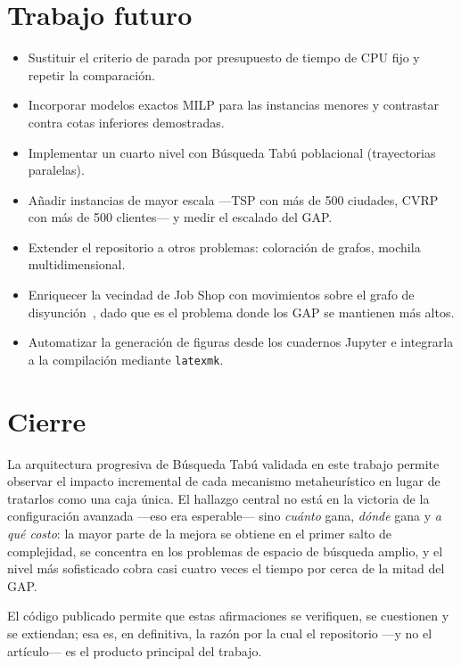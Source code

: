 \section{Trabajo futuro}

\begin{itemize}
  \item Sustituir el criterio de parada por presupuesto de tiempo de CPU fijo
    y repetir la comparación.
  \item Incorporar modelos exactos MILP para las instancias menores y
    contrastar contra cotas inferiores demostradas.
  \item Implementar un cuarto nivel con Búsqueda Tabú poblacional
    (trayectorias paralelas).
  \item Añadir instancias de mayor escala —TSP con más de 500 ciudades, CVRP
    con más de 500 clientes— y medir el escalado del GAP.
  \item Extender el repositorio a otros problemas: coloración de grafos,
    mochila multidimensional.
  \item Enriquecer la vecindad de Job Shop con movimientos sobre el grafo de
    disyunción~\cite{balas1998one}, dado que es el problema donde los GAP se
    mantienen más altos.
  \item Automatizar la generación de figuras desde los cuadernos Jupyter e
    integrarla a la compilación mediante \texttt{latexmk}.
\end{itemize}

\section{Cierre}

La arquitectura progresiva de Búsqueda Tabú validada en este trabajo permite
observar el impacto incremental de cada mecanismo metaheurístico en lugar de
tratarlos como una caja única. El hallazgo central no está en la victoria de la configuración avanzada —eso era esperable— sino \emph{cuánto} gana, \emph{dónde} gana
y \emph{a qué costo}: la mayor parte de la mejora se obtiene en el primer
salto de complejidad, se concentra en los problemas de espacio de búsqueda
amplio, y el nivel más sofisticado cobra casi cuatro veces el tiempo por cerca
de la mitad del GAP.

El código publicado permite que estas afirmaciones se verifiquen, se
cuestionen y se extiendan; esa es, en definitiva, la razón por la cual el repositorio —y no el artículo— es el producto principal del trabajo.
